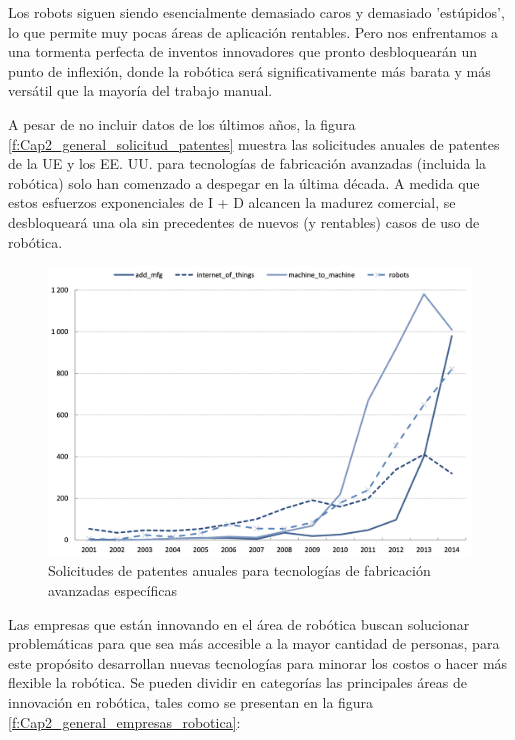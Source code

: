             \newpage
    
    Los robots siguen siendo esencialmente demasiado caros y demasiado 'estúpidos', lo que permite muy pocas áreas de aplicación rentables. Pero nos enfrentamos a una tormenta perfecta de inventos innovadores que pronto desbloquearán un punto de inflexión, donde la robótica será significativamente más barata y más versátil que la mayoría del trabajo manual.
    
     A pesar de no incluir datos de los últimos años, la figura \eqref{f:Cap2_general_solicitud_patentes} muestra las solicitudes anuales de patentes de la UE y los EE. UU. para tecnologías de fabricación avanzadas (incluida la robótica) solo han comenzado a despegar en la última década. A medida que estos esfuerzos exponenciales de I + D alcancen la madurez comercial, se desbloqueará una ola sin precedentes de nuevos (y rentables) casos de uso de robótica. 
     
    \begin{figure}[H]
        \centering
        \includegraphics[width=1\linewidth]{Main/Chapter2/Images2/solicitud-patentes.png}
        \caption{Solicitudes de patentes anuales para tecnologías de fabricación avanzadas específicas \cite{dd98ff58}}
        \label{f:Cap2_general_solicitud_patentes}
    \end{figure}

 
    Las empresas que están innovando en el área de robótica buscan solucionar problemáticas para que sea más accesible a la mayor cantidad de personas, para este propósito desarrollan nuevas tecnologías para minorar los costos o hacer más flexible la robótica. Se pueden dividir en categorías las principales áreas de innovación en robótica, tales como se presentan en la figura \eqref{f:Cap2_general_empresas_robotica}:

